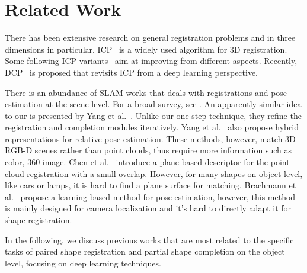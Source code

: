 \section{Related Work} \label{sec:related}

There has been extensive research on general registration problems and in three dimensions in particular. ICP~\cite{besl1992method} is a widely used algorithm for 3D registration. Some following ICP variants~\cite{rusinkiewicz2001efficient, segal2009generalized, bouaziz2013sparse} aim at improving from different aspects. Recently, DCP~\cite{wang2019dcp} is proposed that revisits ICP from a deep learning perspective.

There is an abundance of SLAM works that deals with registrations and pose estimation at the scene level. For a broad survey, see \cite{tam2012registration}. An apparently similar idea to our is presented by Yang et al.~. Unlike our one-step technique, they refine the registration and completion modules iteratively. Yang et al.~\cite{yang2020extreme} also propose hybrid representations for relative pose estimation. These methods, however, match 3D RGB-D scenes rather than point clouds, thus require more information such as color, 360-image.
Chen et al.~ introduce a plane-based descriptor for the point cloud registration with a small overlap. However, for many shapes on object-level, like cars or lamps, it is hard to find a plane surface for matching.
Brachmann et al.~ propose a learning-based method for pose estimation, however, this method is mainly designed for camera localization and it's hard to directly adapt it for shape registration.

In the following, we discuss previous works that are most related to the specific tasks of paired shape registration and partial shape completion on the object level, focusing on deep learning techniques.


